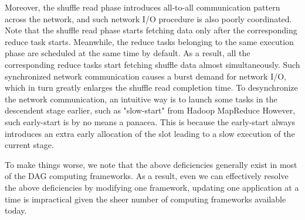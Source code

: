Moreover, the shuffle read phase introduces all-to-all communication pattern across the network, and such network I/O procedure is also poorly coordinated.
Note that the shuffle read phase starts fetching data only after the corresponding reduce task starts.
Meanwhile, the reduce tasks belonging to the same execution phase are scheduled at the same time by default. 
As a result, all the corresponding reduce tasks start fetching shuffle data almost simultaneously.
Such synchronized network communication causes a burst demand for network I/O, which in turn greatly enlarges the shuffle read completion time. 
To desynchronize the network communication, an intuitive way is to launch some tasks in the descendent stage earlier, such as "slow-start" from Hadoop MapReduce
However, such early-start is by no means a panacea. 
This is because the early-start always introduces an extra early allocation of the slot leading to a slow execution of the current stage.




To make things worse, we note that the above deficiencies generally exist in most of the DAG computing frameworks. 
As a result, even we can effectively resolve the above deficiencies by modifying one framework, updating one application at a time is impractical given the sheer number of computing frameworks available today.

